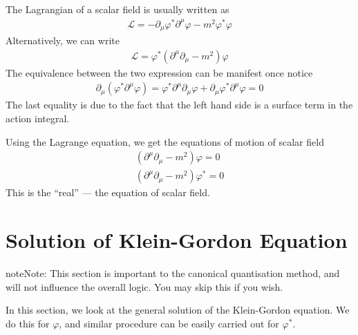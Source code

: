 \documentclass[letterpaper,10pt,english]{sphinxmanual}
\begin{document}
The Lagrangian of a scalar field is usually written as
\begin{equation*}
\begin{split}\mathcal L = -\partial_\mu\varphi^*\partial^\mu\varphi - m^2\varphi^*\varphi\end{split}
\end{equation*}
Alternatively, we can write
\begin{equation*}
\begin{split}\mathcal L = \varphi^*(\partial^\mu\partial_\mu - m^2)\varphi\end{split}
\end{equation*}
The equivalence between the two expression can be manifest once notice
\begin{equation*}
\begin{split}\partial_\mu(\varphi^*\partial^\mu\varphi) = \varphi^*\partial^\mu\partial_\mu \varphi + \partial_\mu\varphi^*\partial^\mu\varphi = 0\end{split}
\end{equation*}
The last equality is due to the fact that the left hand side is a surface term in the action integral.

Using the Lagrange equation, we get the equations of motion of scalar field
\begin{equation*}
\begin{split}(\partial^\mu\partial_\mu - m^2)\varphi = 0\\
(\partial^\mu\partial_\mu - m^2)\varphi^* = 0\end{split}
\end{equation*}
This is the “real”  — the equation of scalar field.


\section{Solution of Klein-Gordon Equation}
\label{\detokenize{clstheo_kgeq::doc}}\label{\detokenize{clstheo_kgeq:solution-of-klein-gordon-equation}}
\begin{sphinxadmonition}{note}{Note:}
This section is important to the canonical quantisation method, and will not influence the overall logic. You may skip this if you wish.
\end{sphinxadmonition}

In this section, we look at the general solution of the Klein-Gordon equation. We do this for \(\varphi\), and similar procedure can be easily carried out for \(\varphi^*\).
\end{document}
